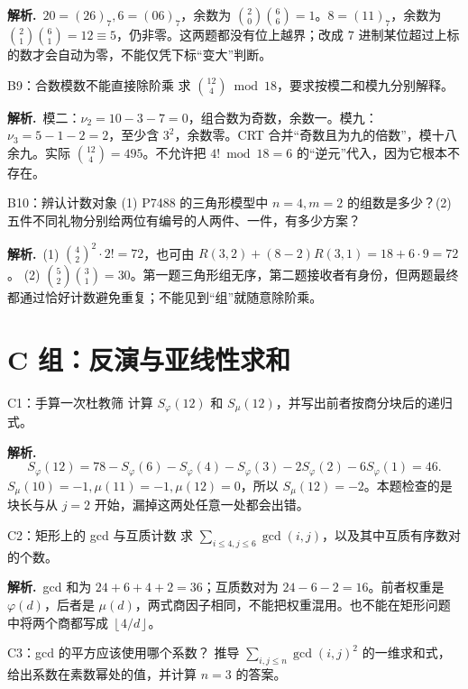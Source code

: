 \documentclass[UTF8,a4paper,11pt,oneside,openany,fontset=fandol]{ctexbook}
\theoremstyle{definition}
\newcommand{\floor}[1]{\left\lfloor #1\right\rfloor}
\newcommand{\sol}{\par\noindent\textbf{解析.}\ }
\begin{document}
\sol $20=(26)_7,6=(06)_7$，余数为 $\binom20\binom66=1$。$8=(11)_7$，余数为 $\binom21\binom61=12\equiv5$，仍非零。这两题都没有位上越界；改成 $7$ 进制某位超过上标的数才会自动为零，不能仅凭下标“变大”判断。


\begin{problem}{B9：合数模数不能直接除阶乘}
求 $\binom{12}{4}\bmod18$，要求按模二和模九分别解释。
\end{problem}

\sol 模二：$\nu_2=10-3-7=0$，组合数为奇数，余数一。模九：$\nu_3=5-1-2=2$，至少含 $3^2$，余数零。CRT 合并“奇数且为九的倍数”，模十八余九。实际 $\binom{12}{4}=495$。不允许把 $4!\bmod18=6$ 的“逆元”代入，因为它根本不存在。


\begin{problem}{B10：辨认计数对象}
(1) P7488 的三角形模型中 $n=4,m=2$ 的组数是多少？(2) 五件不同礼物分别给两位有编号的人两件、一件，有多少方案？
\end{problem}

\sol (1) $\binom42^2\cdot2!=72$，也可由 $R(3,2)+(8-2)R(3,1)=18+6\cdot9=72$。 (2) $\binom52\binom31=30$。第一题三角形组无序，第二题接收者有身份，但两题最终都通过恰好计数避免重复；不能见到“组”就随意除阶乘。


\section{C 组：反演与亚线性求和}
\begin{problem}{C1：手算一次杜教筛}
计算 $S_\varphi(12)$ 和 $S_\mu(12)$，并写出前者按商分块后的递归式。
\end{problem}

\sol
\[
S_\varphi(12)=78-S_\varphi(6)-S_\varphi(4)-S_\varphi(3)-2S_\varphi(2)-6S_\varphi(1)=46.
\]
$S_\mu(10)=-1,\mu(11)=-1,\mu(12)=0$，所以 $S_\mu(12)=-2$。本题检查的是块长与从 $j=2$ 开始，漏掉这两处任意一处都会出错。


\begin{problem}{C2：矩形上的 gcd 与互质计数}
求 $\sum_{i\le4,j\le6}\gcd(i,j)$，以及其中互质有序数对的个数。
\end{problem}

\sol gcd 和为 $24+6+4+2=36$；互质数对为 $24-6-2=16$。前者权重是 $\varphi(d)$，后者是 $\mu(d)$，两式商因子相同，不能把权重混用。也不能在矩形问题中将两个商都写成 $\floor{4/d}$。


\begin{problem}{C3：gcd 的平方应该使用哪个系数？}
推导 $\sum_{i,j\le n}\gcd(i,j)^2$ 的一维求和式，给出系数在素数幂处的值，并计算 $n=3$ 的答案。
\end{problem}
\end{document}
